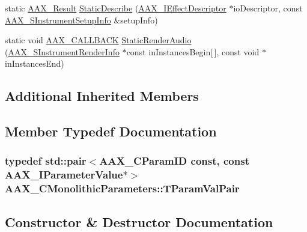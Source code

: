 \begin{DoxyCompactItemize}
static \hyperlink{a00149_a4d8f69a697df7f70c3a8e9b8ee130d2f}{A\+A\+X\+\_\+\+Result} \hyperlink{a00026_a69f9b80a70ecc6b7b2a7eec372d2502a}{Static\+Describe} (\hyperlink{a00096}{A\+A\+X\+\_\+\+I\+Effect\+Descriptor} $\ast$io\+Descriptor, const \hyperlink{a00124}{A\+A\+X\+\_\+\+S\+Instrument\+Setup\+Info} \&setup\+Info)
\item 
static void \hyperlink{a00149_aaa22112139aa627574b1ef562f579d43}{A\+A\+X\+\_\+\+C\+A\+L\+L\+B\+A\+C\+K} \hyperlink{a00026_aff6c9ac549ab88231759a9311b2a6640}{Static\+Render\+Audio} (\hyperlink{a00123}{A\+A\+X\+\_\+\+S\+Instrument\+Render\+Info} $\ast$const in\+Instances\+Begin\mbox{[}$\,$\mbox{]}, const void $\ast$in\+Instances\+End)
\end{DoxyCompactItemize}
\subsection*{Additional Inherited Members}


\subsection{Member Typedef Documentation}
\hypertarget{a00026_ac0f3767546709abcf078503bc7dc636b}{}
\subsubsection[{T\+Param\+Val\+Pair}]{\setlength{\rightskip}{0pt plus 5cm}typedef std\+::pair$<${\bf A\+A\+X\+\_\+\+C\+Param\+I\+D} const, const {\bf A\+A\+X\+\_\+\+I\+Parameter\+Value}$\ast$$>$ {\bf A\+A\+X\+\_\+\+C\+Monolithic\+Parameters\+::\+T\+Param\+Val\+Pair}\hspace{0.3cm}{\ttfamily [protected]}}\label{a00026_ac0f3767546709abcf078503bc7dc636b}


\subsection{Constructor \& Destructor Documentation}
\hypertarget{a00026_a392d2cfd3a182653ab3116e8ee43bf55}{}
